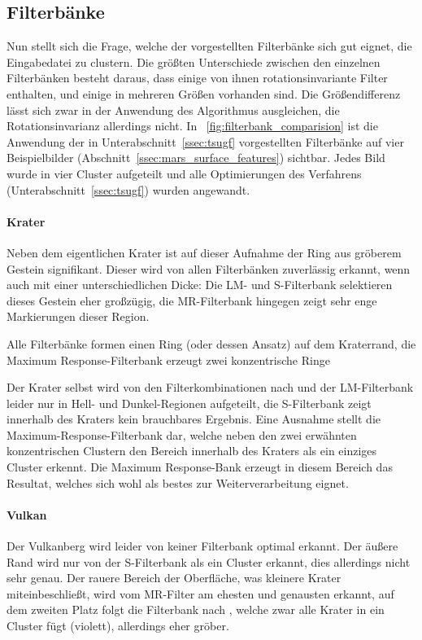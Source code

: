 \subsection{Filterbänke}
\label{ssec:initialization_filterbanks}
Nun stellt sich die Frage, welche der vorgestellten Filterbänke sich gut eignet, die Eingabedatei zu clustern. Die größten Unterschiede zwischen den einzelnen Filterbänken besteht daraus, dass einige von ihnen rotationsinvariante Filter enthalten, und einige in mehreren Größen vorhanden sind. Die Größendifferenz lässt sich zwar in der Anwendung des Algorithmus ausgleichen, die Rotationsinvarianz allerdings nicht. In \figurename~\ref{fig:filterbank_comparision} ist die Anwendung der in Unterabschnitt~\ref{ssec:tsugf} vorgestellten Filterbänke auf vier Beispielbilder (\vgl Abschnitt~\ref{ssec:mars_surface_features}) sichtbar. Jedes Bild wurde in vier Cluster aufgeteilt und alle Optimierungen des Verfahrens (\vgl Unterabschnitt~\ref{ssec:tsugf}) wurden angewandt.

\paragraph{Krater}
Neben dem eigentlichen Krater ist auf dieser Aufnahme der Ring aus gröberem Gestein signifikant. Dieser wird von allen Filterbänken zuverlässig erkannt, wenn auch mit einer unterschiedlichen Dicke: Die LM- und S-Filterbank selektieren dieses Gestein eher großzügig, die MR-Filterbank hingegen zeigt sehr enge Markierungen dieser Region.

Alle Filterbänke formen einen Ring (oder dessen Ansatz) auf dem Kraterrand, die Maximum Response-Filterbank erzeugt zwei konzentrische Ringe

Der Krater selbst wird von den Filterkombinationen nach \cite{jain_91} und der LM-Filterbank leider nur in Hell- und Dunkel-Regionen aufgeteilt, die S-Filterbank zeigt innerhalb des Kraters kein brauchbares Ergebnis. Eine Ausnahme stellt die Maximum-Response-Filterbank dar, welche neben den zwei erwähnten konzentrischen Clustern den Bereich innerhalb des Kraters als ein einziges Cluster erkennt. Die Maximum Response-Bank erzeugt in diesem Bereich das Resultat, welches sich wohl als bestes zur Weiterverarbeitung eignet.

\paragraph{Vulkan}
Der Vulkanberg wird leider von keiner Filterbank optimal erkannt. Der äußere Rand wird nur von der S-Filterbank als ein Cluster erkannt, dies allerdings nicht sehr genau. Der rauere Bereich der Oberfläche, was kleinere Krater miteinbeschließt, wird vom MR-Filter am ehesten und genausten erkannt, auf dem zweiten Platz folgt die Filterbank nach \cite{jain_91}, welche zwar alle Krater in ein Cluster fügt (violett), allerdings eher gröber.

